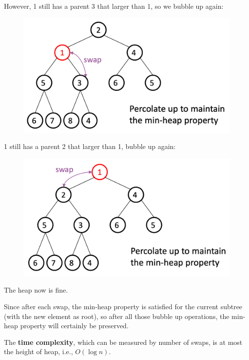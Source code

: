 \begin{spacing}{1.3}
    However, 1 still has a parent 3 that larger than 1, so we bubble up again:
    \begin{figure}[htbp]
        \centering
        \includegraphics[scale=0.25]{images/05-insert-3.png}
    \end{figure}

    1 still has a parent 2 that larger than 1, bubble up again:
    \begin{figure}[htbp]
        \centering
        \includegraphics[scale=0.25]{images/05-insert-4.png}
    \end{figure}

    The heap now is fine.

    Since after each swap, the min-heap property is satisfied for the current subtree
    (with the new element as root), so after all those bubble up operations, the 
    min-heap property will certainly be preserved.

    The {\bf time complexity}, which can be measured by number of swaps, is 
    at most the height of heap, i.e., $O(\log n)$.


\end{spacing}
